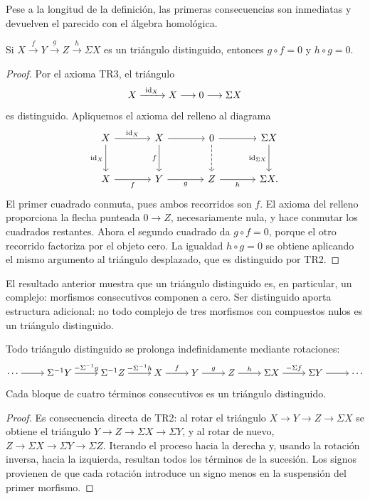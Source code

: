 Pese a la longitud de la definición, las primeras consecuencias son inmediatas y devuelven el parecido con el álgebra homológica.

\begin{prop}\label{prop:compuesta}
Si $X\xrightarrow{f}Y\xrightarrow{g}Z\xrightarrow{h}\Sigma X$ es un triángulo distinguido, entonces $g\circ f=0$ y $h\circ g=0$.
\end{prop}
\begin{proof}
Por el axioma \textup{TR3}, el triángulo
\[
X\xrightarrow{\ \id_X\ }X\longrightarrow0\longrightarrow\Sigma X
\]
es distinguido. Apliquemos el axioma del relleno al diagrama
\[
\begin{tikzcd}[column sep=large, row sep=large]
X \arrow[r,"\id_X"] \arrow[d,"\id_X"'] & X \arrow[r] \arrow[d,"f"'] & 0 \arrow[r] \arrow[d,dashed] & \Sigma X \arrow[d,"\id_{\Sigma X}"']\\
X \arrow[r,"f"'] & Y \arrow[r,"g"'] & Z \arrow[r,"h"'] & \Sigma X .
\end{tikzcd}
\]
El primer cuadrado conmuta, pues ambos recorridos son $f$. El axioma del relleno proporciona la flecha punteada $0\to Z$, necesariamente nula, y hace conmutar los cuadrados restantes. Ahora el segundo cuadrado da $g\circ f=0$, porque el otro recorrido factoriza por el objeto cero. La igualdad $h\circ g=0$ se obtiene aplicando el mismo argumento al triángulo desplazado, que es distinguido por \textup{TR2}.
\end{proof}

El resultado anterior muestra que un triángulo distinguido es, en particular, un complejo: morfismos consecutivos componen a cero. Ser distinguido aporta estructura adicional: no todo complejo de tres morfismos con compuestos nulos es un triángulo distinguido.

\begin{prop}\label{prop:infinita}
Todo triángulo distinguido se prolonga indefinidamente mediante rotaciones:
\[\begin{tikzcd}[cramped]
\cdots
\arrow[r] &
\Sigma^{-1}Y
\arrow[r,"-\Sigma^{-1}g"] &
\Sigma^{-1}Z
\arrow[r,"-\Sigma^{-1}h"] &
X
\arrow[r,"f"] &
Y
\arrow[r,"g"] &
Z
\arrow[r,"h"] &
\Sigma X
\arrow[r,"-\Sigma f"] &
\Sigma Y
\arrow[r] &
\cdots
\end{tikzcd}\]
Cada bloque de cuatro términos consecutivos es un triángulo distinguido.
\end{prop}
\begin{proof}
Es consecuencia directa de \textup{TR2}: al rotar el triángulo $X\to Y\to Z\to\Sigma X$ se obtiene el triángulo $Y\to Z\to\Sigma X\to\Sigma Y$, y al rotar de nuevo, $Z\to\Sigma X\to\Sigma Y\to\Sigma Z$. Iterando el proceso hacia la derecha y, usando la rotación inversa, hacia la izquierda, resultan todos los términos de la sucesión. Los signos provienen de que cada rotación introduce un signo menos en la suspensión del primer morfismo.
\end{proof}

